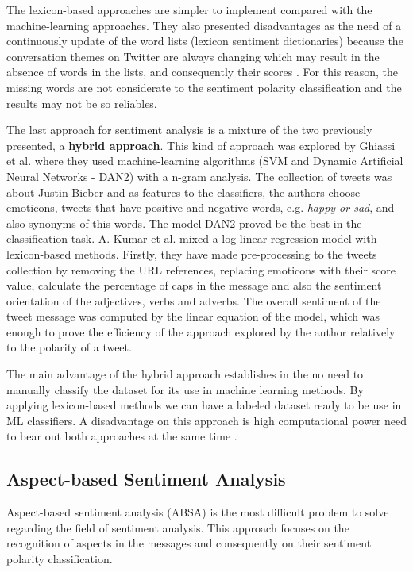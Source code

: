 The lexicon-based approaches are simpler to implement compared with the machine-learning approaches. They also presented disadvantages as the need of a continuously update of the word lists (lexicon sentiment dictionaries) because the conversation themes on Twitter are always changing which may result in the absence of words in the lists, and consequently their scores \cite{kn:Giachanou2016}. For this reason, the missing words are not considerate to the sentiment polarity classification and the results may not be so reliables.

The last approach for sentiment analysis is a mixture of the two previously presented, a \textbf{hybrid approach}. This kind of approach was explored by Ghiassi et al. \cite{kn:Ghiassi2013} where they used machine-learning algorithms (SVM and Dynamic Artificial Neural Networks - DAN2) with a n-gram analysis. The collection of tweets was about Justin Bieber and as features to the classifiers, the authors choose emoticons, tweets that have positive and negative words, e.g. \textit{happy or sad}, and also synonyms of this words. The model DAN2 proved be the best in the classification task.
A. Kumar et al. \cite{kn:kumar2012} mixed a log-linear regression model with lexicon-based methods. Firstly, they have made pre-processing to the tweets collection by removing the URL references, replacing emoticons with their score value, calculate the percentage of caps in the message and also the sentiment orientation of the adjectives, verbs and adverbs. The overall sentiment of the tweet message was computed by the linear equation of the model, which was enough to prove the efficiency of the approach explored by the author relatively to the polarity of a tweet.

The main advantage of the hybrid approach establishes in the no need to manually classify the dataset for its use in machine learning methods. By applying lexicon-based methods we can have a labeled dataset ready to be use in ML classifiers. A disadvantage on this approach is high computational power need to bear out both approaches at the same time \cite{kn:Giachanou2016}.

\subsection{Aspect-based Sentiment Analysis}
Aspect-based sentiment analysis (ABSA) is the most difficult problem to solve regarding the field of sentiment analysis. This approach focuses on the recognition of aspects in the messages and consequently on their sentiment polarity classification.

